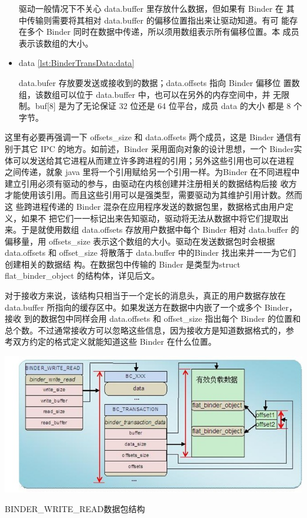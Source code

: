 \documentclass[a4paper,11pt]{article}
\begin{document}
\begin{itemize}
          驱动一般情况下不关心 data.buffer 里存放什么数据，但如果有 Binder 在
          其中传输则需要将其相对 data.buffer 的偏移位置指出来让驱动知道。有可
          能存在多个 Binder 同时在数据中传递，所以须用数组表示所有偏移位置。本
          成员表示该数组的大小。

      \item data \ref{lst:BinderTransData:data}

          data.bufer 存放要发送或接收到的数据；data.offsets 指向 Binder 偏移位
          置数组，该数组可以位于 data.buffer 中，也可以在另外的内存空间中，并
          无限制。buf[8] 是为了无论保证 32 位还是 64 位平台，成员 data 的大小
          都是 8 个字节。

\end{itemize}

这里有必要再强调一下 offsets_size 和 data.offsets 两个成员，这是 Binder 通信有
别于其它 IPC 的地方。如前述，Binder 采用面向对象的设计思想，一个
Binder实体可以发送给其它进程从而建立许多跨进程的引用；另外这些引用也可以在进程
之间传递，就象 java 里将一个引用赋给另一个引用一样。为Binder
在不同进程中建立引用必须有驱动的参与，由驱动在内核创建并注册相关的数据结构后接
收方才能使用该引用。而且这些引用可以是强类型，需要驱动为其维护引用计数。然而这
些跨进程传递的 Binder 混杂在应用程序发送的数据包里，数据格式由用户定义，如果不
把它们一一标记出来告知驱动，驱动将无法从数据中将它们提取出来。于是就使用数组
data.offsets 存放用户数据中每个 Binder 相对 data.buffer 的偏移量，用
offsets_size 表示这个数组的大小。驱动在发送数据包时会根据 data.offsets 和
offset_size 将散落于 data.buffer 中的Binder 找出来并一一为它们创建相关的数据结
构。在数据包中传输的 Binder 是类型为struct flat_binder_object 的结构体，详见后文。

对于接收方来说，该结构只相当于一个定长的消息头，真正的用户数据存放在
data.buffer 所指向的缓存区中。如果发送方在数据中内嵌了一个或多个 Binder，接收
到的数据包中同样会用 data.offsets 和 offset_size 指出每个 Binder
的位置和总个数。不过通常接收方可以忽略这些信息，因为接收方是知道数据格式的，参
考双方约定的格式定义就能知道这些 Binder 在什么位置。

\begin{minipage}{\textwidth}
\includegraphics[scale=0.66]{binderproto.jpg}

\caption{ BINDER_WRITE_READ数据包结构\label{fig:BinderData}}
\end{minipage}
\end{document}
